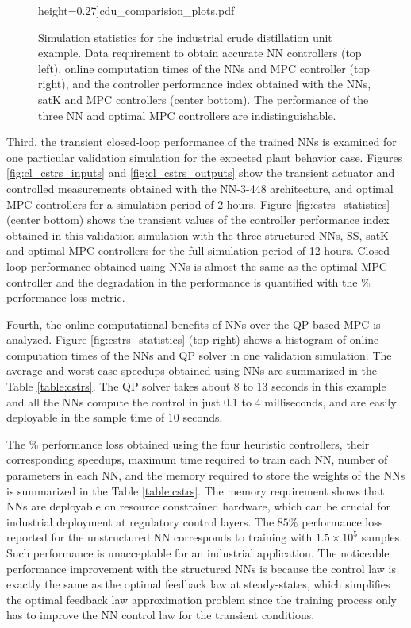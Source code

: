 \documentclass[preprint,5p, twocolumn, authoryear]{elsarticle}
\begin{document}
\begin{figure}[!h]
\begin{center}
        height=0.27\textheight]{cdu_comparision_plots.pdf}\end{center}
    \vspace{-0.2in}
    \caption{Simulation statistics for the industrial crude distillation unit
    example. Data requirement to obtain accurate NN controllers (top left),
    online computation times of the NNs and MPC controller (top right), and the
    controller performance index obtained with the NNs, satK and MPC controllers
    (center bottom). The performance of the three NN and optimal MPC controllers
    are indistinguishable.}	
    \label{fig:cdu_statistics}
\end{figure}

Third, the transient closed-loop performance of the trained NNs is examined for
one particular validation simulation for the expected plant behavior case.
Figures \ref{fig:cl_cstrs_inputs} and \ref{fig:cl_cstrs_outputs} show the
transient actuator and controlled measurements obtained with the NN-3-448
architecture, and optimal MPC controllers for a simulation period of 2 hours.
Figure \ref{fig:cstrs_statistics} (center bottom) shows the transient values of
the controller performance index obtained in this validation simulation with the
three structured NNs, SS, satK and optimal MPC controllers for the full
simulation period of 12 hours. Closed-loop performance obtained using NNs is
almost the same as the optimal MPC controller and the degradation in the
performance is quantified with the $\%$ performance loss metric.

Fourth, the online computational benefits of NNs over the QP based MPC is
analyzed. Figure \ref{fig:cstrs_statistics} (top right) shows a histogram of
online computation times of the NNs and QP solver in one validation simulation.
The average and worst-case speedups obtained using NNs are summarized in the
Table \ref{table:cstrs}. The QP solver takes about 8 to 13 seconds in this
example and all the NNs compute the control in just 0.1 to 4 milliseconds, and
are easily deployable in the sample time of 10 seconds.

The $\%$ performance loss obtained using the four heuristic controllers, their
corresponding speedups, maximum time required to train each NN, number of
parameters in each NN, and the memory required to store the weights of the NNs
is summarized in the Table \ref{table:cstrs}. The memory requirement shows that
NNs are deployable on resource constrained hardware, which can be crucial for
industrial deployment at regulatory control layers. The $85 \%$ performance loss
reported for the unstructured NN corresponds to training with $1.5 \times 10^5$
samples. Such performance is unacceptable for an industrial application. The
noticeable performance improvement with the structured NNs is because the
control law is exactly the same as the optimal feedback law at steady-states,
which simplifies the optimal feedback law approximation problem since the
training process only has to improve the NN control law for the transient
conditions. 
\end{document}
